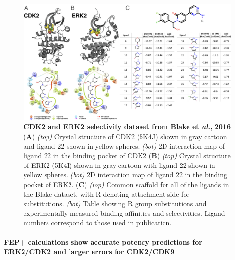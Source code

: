 \documentclass[9pt,lineno]{elife-modified} %
\begin{document}
\begin{figure}
\begin{fullwidth}
\begin{centering}
\includegraphics[width=1.0\linewidth]{figures/figure3.png}
\end{centering}
\caption{
\label{fig:figure-3}
{\bf CDK2 and ERK2 selectivity dataset from Blake et \emph{al}., 2016} \\
({\bf A})  \emph{(top)} Crystal structure of CDK2 (5K4J) shown in gray cartoon and ligand 22 shown in yellow spheres. \emph{(bot)} 2D interaction map of ligand 22 in the binding pocket of CDK2
({\bf B}) \emph{(top)} Crystal structure of ERK2 (5K4I) shown in gray cartoon with ligand 22 shown in yellow spheres. \emph{(bot)} 2D interaction map of ligand 22 in the binding pocket of ERK2.
({\bf C}) \emph{(top)} Common scaffold for all of the ligands in the Blake dataset, with R denoting attachment side for substitutions. \emph{(bot)} Table showing R group substitutions and experimentally measured binding affinities and selectivities. Ligand numbers correspond to those used in publication. 
}
\end{fullwidth}
\end{figure}

\paragraph{FEP+ calculations show accurate potency predictions for ERK2/CDK2 and larger errors for CDK2/CDK9}
\end{document}
